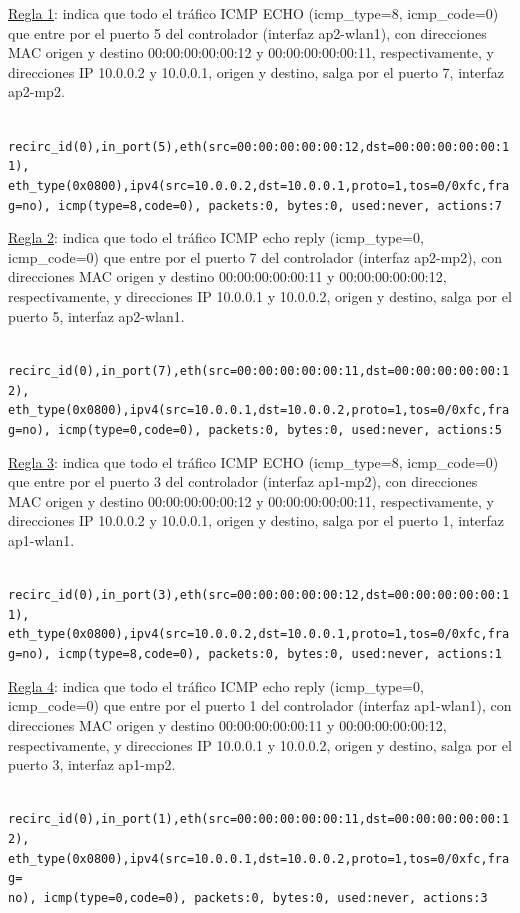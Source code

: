 \documentclass[a4paper,12pt,twoside,spanish]{book}
\begin{document}
\underline{Regla 1}: indica que todo el tráfico ICMP ECHO (icmp\_type=8, icmp\_code=0) que entre por el puerto 5 del controlador (interfaz ap2-wlan1), con direcciones MAC origen y destino 00:00:00:00:00:12 y 00:00:00:00:00:11, respectivamente, y direcciones IP 10.0.0.2 y 10.0.0.1, origen y destino, salga por el puerto 7, interfaz ap2-mp2.\par 

\noindent\texttt{
	recirc\_id(0),in\_port(5),eth(src=00:00:00:00:00:12,dst=00:00:00:00:00:11),
	eth\_type(0x0800),ipv4(src=10.0.0.2,dst=10.0.0.1,proto=1,tos=0/0xfc,frag=no),
	icmp(type=8,code=0), packets:0, bytes:0, 	used:never, actions:7
}


\underline{Regla 2}: indica que todo el tráfico ICMP echo reply (icmp\_type=0, icmp\_code=0) que entre por el puerto 7 del controlador (interfaz ap2-mp2), con direcciones MAC origen y destino 00:00:00:00:00:11 y 00:00:00:00:00:12, respectivamente, y direcciones IP 10.0.0.1 y 10.0.0.2, origen y destino, salga por el puerto 5, interfaz ap2-wlan1.\par 

\noindent\texttt{
	recirc\_id(0),in\_port(7),eth(src=00:00:00:00:00:11,dst=00:00:00:00:00:12),
	eth\_type(0x0800),ipv4(src=10.0.0.1,dst=10.0.0.2,proto=1,tos=0/0xfc,frag=no),
	icmp(type=0,code=0), packets:0, bytes:0, 	used:never, actions:5
}

\underline{Regla 3}: indica que todo el tráfico ICMP ECHO (icmp\_type=8, icmp\_code=0) que entre por el puerto 3 del controlador (interfaz ap1-mp2), con direcciones MAC origen y destino 00:00:00:00:00:12 y 00:00:00:00:00:11, respectivamente, y direcciones IP 10.0.0.2 y 10.0.0.1, origen y destino, salga por el puerto 1, interfaz ap1-wlan1.\par 

\noindent\texttt{
	recirc\_id(0),in\_port(3),eth(src=00:00:00:00:00:12,dst=00:00:00:00:00:11),
	eth\_type(0x0800),ipv4(src=10.0.0.2,dst=10.0.0.1,proto=1,tos=0/0xfc,frag=no),
	icmp(type=8,code=0), packets:0, bytes:0, 	used:never, actions:1
}

\underline{Regla 4}: indica que todo el tráfico ICMP echo reply (icmp\_type=0, icmp\_code=0) que entre por el puerto 1 del controlador (interfaz ap1-wlan1), con direcciones MAC origen y destino 00:00:00:00:00:11 y 00:00:00:00:00:12, respectivamente, y direcciones IP 10.0.0.1 y 10.0.0.2, origen y destino, salga por el puerto 3, interfaz ap1-mp2.\par 

\noindent\texttt{
	recirc\_id(0),in\_port(1),eth(src=00:00:00:00:00:11,dst=00:00:00:00:00:12),
	eth\_type(0x0800),ipv4(src=10.0.0.1,dst=10.0.0.2,proto=1,tos=0/0xfc,frag=\\no),
	icmp(type=0,code=0), packets:0, bytes:0, 	used:never, actions:3
}
\end{document}
